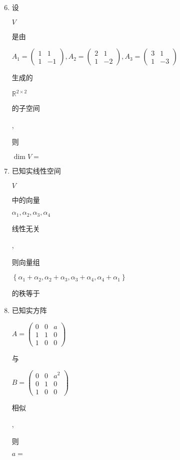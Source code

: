 \documentclass[10pt]{article}
\begin{document}
\begin{enumerate}
  \setcounter{enumi}{5}
  \item \begin{CJK}{UTF8}{mj}设\end{CJK} $V$ \begin{CJK}{UTF8}{mj}是由\end{CJK} $A_{1}=\left(\begin{array}{cc}1 & 1 \\ 1 & -1\end{array}\right), A_{2}=\left(\begin{array}{cc}2 & 1 \\ 1 & -2\end{array}\right), A_{3}=\left(\begin{array}{cc}3 & 1 \\ 1 & -3\end{array}\right)$ \begin{CJK}{UTF8}{mj}生成的\end{CJK} $\mathbb{R}^{2 \times 2}$ \begin{CJK}{UTF8}{mj}的子空间\end{CJK}, \begin{CJK}{UTF8}{mj}则\end{CJK} $\operatorname{dim} V=$

  \item \begin{CJK}{UTF8}{mj}已知实线性空间\end{CJK} $V$ \begin{CJK}{UTF8}{mj}中的向量\end{CJK} $\alpha_{1}, \alpha_{2}, \alpha_{3}, \alpha_{4}$ \begin{CJK}{UTF8}{mj}线性无关\end{CJK}, \begin{CJK}{UTF8}{mj}则向量组\end{CJK} $\left\{\alpha_{1}+\alpha_{2}, \alpha_{2}+\alpha_{3}, \alpha_{3}+\alpha_{4}, \alpha_{4}+\alpha_{1}\right\}$ \begin{CJK}{UTF8}{mj}的秩等于\end{CJK}

  \item \begin{CJK}{UTF8}{mj}已知实方阵\end{CJK} $A=\left(\begin{array}{ccc}0 & 0 & a \\ 1 & 1 & 0 \\ 1 & 0 & 0\end{array}\right)$ \begin{CJK}{UTF8}{mj}与\end{CJK} $B=\left(\begin{array}{ccc}0 & 0 & a^{2} \\ 0 & 1 & 0 \\ 1 & 0 & 0\end{array}\right)$ \begin{CJK}{UTF8}{mj}相似\end{CJK}, \begin{CJK}{UTF8}{mj}则\end{CJK} $a=$


\end{enumerate}
\end{document}
